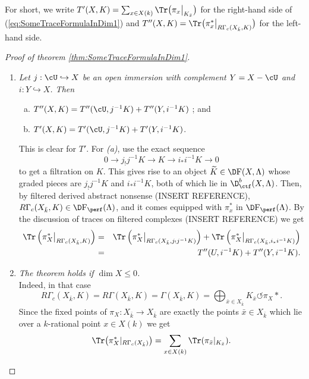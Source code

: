 \begin{notation} 
For short, we write $T'(X, K) = \sum_{x\in X(k)} \Tr\big(\pi_x\big|_{K_{\bar x}}\big)$ for the right-hand side of (\ref{eq:SomeTraceFormulaInDim1}) and $T''(X, K) =\Tr\big(\pi_x^*\big|_{R\Gamma_c(X_{\bar k}, K)}\big)$ for the left-hand side.
\end{notation}

\begin{proof}[Proof of theorem \ref{thm:SomeTraceFormulaInDim1}] 
$ $
\begin{enumerate}[\it Step 1.]
\item
{\it Let $j: \cU\hookrightarrow X$ be an open immersion with complement $Y = X - \cU$ and $i: Y \hookrightarrow X$. Then
\begin{enumerate}[(a)]
\item $T''(X, K) = T''(\cU, j^{-1} K)+ T''(Y, i^{-1}K)$ ; and
\item $T'(X, K) = T'(\cU, j^{-1} K)+ T'(Y, i^{-1}K)$.
\end{enumerate}}
This is clear for $T'$. For {\it (a)}, use the exact sequence 
$$
0\to j_!j^{-1} K \to K \to i_* i^{-1} K \to 0
$$ 
to get a filtration on $K$. This gives rise to an object $\widetilde K \in \D\mathrm{F}(X, \Lambda)$ whose graded pieces are $j_!j^{-1}K$ and $i_*i^{-1}K$, both of which lie in $\D_{\ctf}^b(X, \Lambda)$. Then, by filtered derived abstract nonsense (INSERT REFERENCE), $R\Gamma_c(X_{\bar k}, K)\in \D\mathrm{F}_{\perf}(\Lambda)$, and it comes equipped with $\pi_x^*$ in $\D\mathrm{F}_{\perf}(\Lambda)$. By the discussion of traces on filtered complexes (INSERT REFERENCE) we get
\begin{eqnarray*}
\Tr\left(\pi_X^*\big|_{R\Gamma_c(X_{\bar k}, K)}\right) 
& = & \Tr\left(\pi_X^*\big|_{R\Gamma_c(X_{\bar k}, j_!j^{-1}K)}\right)+ \Tr\left(\pi_X^*\big|_{R\Gamma_c(X_{\bar k}, i_*i^{-1}K)}\right)
\\
& = & T''(U, i^{-1}K) + T''(Y, i^{-1}K).
\end{eqnarray*}
\item 
{\it The theorem holds if $\dim X\leqslant 0$. }
\\
Indeed, in that case
$$
R\Gamma_c(X_{\bar k}, K)  = R\Gamma(X_{\bar k}, K) = \Gamma(X_{\bar k}, K) = \bigoplus_{\bar x\in X_{\bar k}} K_{\bar x}\circlearrowleft \pi_X*.
$$
Since the fixed points of $\pi_X: X_{\bar k}\to X_{\bar k}$ are exactly the points $\bar x\in X_{\bar k}$ which lie over a $k$-rational point $x\in X(k)$ we get
$$
\Tr\big(\pi_X^*|_{R\Gamma_c(X_{\bar k})}\big) = \sum_{x\in X(k)}\Tr(\pi_{\bar x}|_{K_{\bar x}}).
$$
\end{enumerate}
\end{proof}
